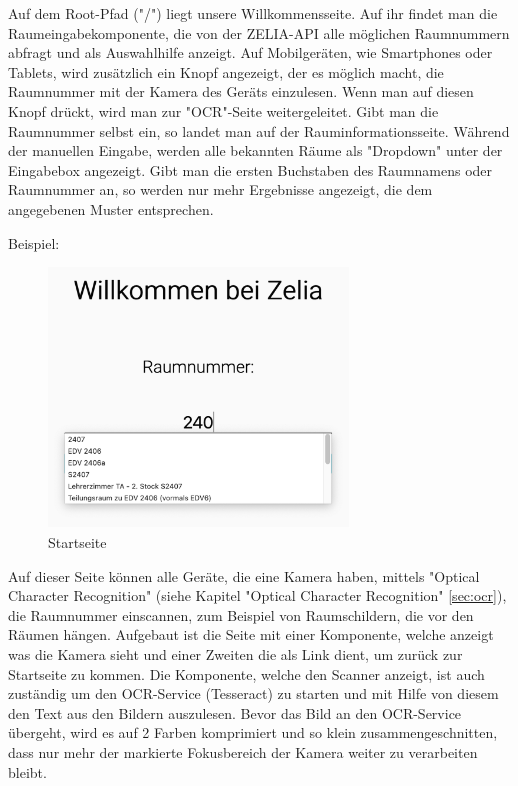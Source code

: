\label{sec:webcompstart}

Auf dem Root-Pfad ("/") liegt unsere Willkommensseite. Auf ihr findet man die Raumeingabekomponente, die von der ZELIA-API alle möglichen Raumnummern abfragt und als Auswahlhilfe anzeigt. Auf Mobilgeräten, wie Smartphones oder Tablets, wird zusätzlich ein Knopf angezeigt, der es möglich macht, die Raumnummer mit der Kamera des Geräts einzulesen. Wenn man auf diesen Knopf drückt, wird man zur "OCR"-Seite weitergeleitet. Gibt man die Raumnummer selbst ein, so landet man auf der Rauminformationsseite. Während der manuellen Eingabe, werden alle bekannten Räume als "Dropdown" unter der Eingabebox angezeigt. Gibt man die ersten Buchstaben des Raumnamens oder Raumnummer an, so werden nur mehr Ergebnisse angezeigt, die dem angegebenen Muster entsprechen.

Beispiel:

\begin{figure}[H]
    \centering
    \includegraphics[width=80mm]{media/WebComponents/Startseite_light.png}
    \caption{Startseite}
    \label{fig:compinput}
\end{figure}



Auf dieser Seite können alle Geräte, die eine Kamera haben, mittels "Optical Character Recognition" (siehe Kapitel "Optical Character Recognition" \ref{sec:ocr}), die Raumnummer einscannen, zum Beispiel von Raumschildern, die vor den Räumen hängen. Aufgebaut ist die Seite mit einer Komponente, welche anzeigt was die Kamera sieht und einer Zweiten die als Link dient, um zurück zur Startseite zu kommen. Die Komponente, welche den Scanner anzeigt, ist auch zuständig um den OCR-Service (Tesseract) zu starten und mit Hilfe von diesem den Text aus den Bildern auszulesen. Bevor das Bild an den OCR-Service übergeht, wird es auf 2 Farben komprimiert und so klein zusammengeschnitten, dass nur mehr der markierte Fokusbereich der Kamera weiter zu verarbeiten bleibt.


